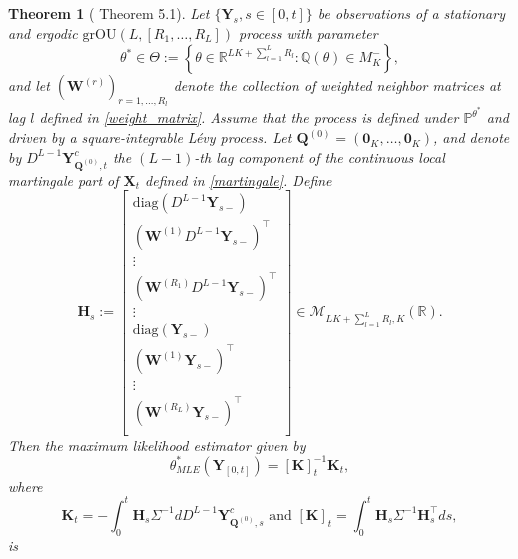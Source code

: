 \documentclass[12pt]{amsart}
\newtheorem{theorem}{Theorem}[section]
\numberwithin{equation}{section}
\newcommand{\R}{\mathbb{R}}
\newcommand{\1}{\mathbf{1}}
\begin{document}
\begin{theorem}[\cite{lucchese2026estimation} Theorem 5.1]
\label{thm}
    Let $\{\mathbf{Y}_s,s\in[0,t]\}$ be observations of a stationary and ergodic $\mathrm{grOU}(L, [R_1,\dots,R_L])$ process with parameter
    \begin{equation*}
    \theta^*\in\Theta:=\left\lbrace\theta\in\R^{LK+\sum_{l=1}^LR_l}:\mathbb{Q}(\theta)\in M_K^-\right\rbrace,
    \end{equation*}
    and let $(\mathbf{W}^{(r)})_{r=1, \ldots, R_l}$ denote the collection of weighted neighbor matrices at lag $l$ defined in \eqref{weight_matrix}. Assume that the process is defined under $\mathbb{P}^{\theta^*}$ and driven by a square-integrable L\'evy process. Let $\mathbf{Q}^{(0)}=(\mathbf{0}_K,\dots,\mathbf{0}_K)$, and denote by $D^{L-1}\mathbf{Y}^c_{\mathbf{Q}^{(0)},t}$ the $(L-1)$-th lag component of the continuous local martingale part of $\mathbf{X}_t$ defined in \eqref{martingale}. Define
    \begin{equation*}
        \mathbf{H}_s := \begin{bmatrix}
    \mathrm{diag}\left(D^{L-1}\mathbf{Y}_{s-}\right)\\
    (\mathbf{W}^{(1)}D^{L-1}\mathbf{Y}_{s-})^{\top}\\
    \vdots\\
    (\mathbf{W}^{(R_1)}D^{L-1}\mathbf{Y}_{s-})^{\top}\\
    \vdots\\
    \mathrm{diag}\left(\mathbf{Y}_{s-}\right)\\
    (\mathbf{W}^{(1)}\mathbf{Y}_{s-})^{\top}\\
    \vdots\\
    (\mathbf{W}^{(R_L)}\mathbf{Y}_{s-})^{\top}\\
    \end{bmatrix}\in\mathcal{M}_{LK+\sum_{l=1}^LR_l,K}(\mathbb{R}).
    \end{equation*}
    Then the maximum likelihood estimator given by 
    \begin{equation*}
\theta_{MLE}^*\left(\mathbf{Y}_{[0,t]}\right)=[\mathbf{K}]_t^{-1}\mathbf{K}_t,
    \end{equation*}
    where
\begin{equation}
\label{K_t}
    \mathbf{K}_t=-\int_0^t\mathbf{H}_s\Sigma^{-1}dD^{L-1}\mathbf{Y}^{c}_{\mathbf{Q}^{(0)},s}
\text{ and }
    [\mathbf{K}]_t=\int_0^t\mathbf{H}_s\Sigma^{-1}\mathbf{H}_s^{\top}ds,
\end{equation}
is
\begin{itemize}

\end{itemize}
\end{theorem}
\end{document}
